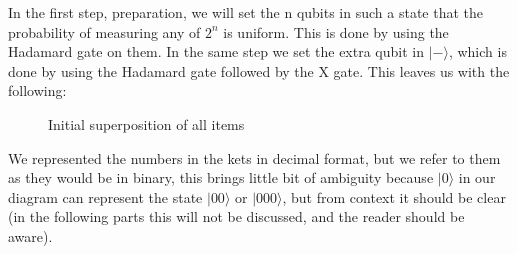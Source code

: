 In the first step, preparation, we will set the n qubits in such a state that the probability of measuring any of $2^n$ is uniform. This is done by using the Hadamard gate on them. In the same step we set the extra qubit in $|-\rangle$, which is done by using the Hadamard gate followed by the X gate. This leaves us with the following:

\begin{center}
\begin{figure}[h]
\caption{Initial superposition of all items} \label{state_pref_graph}
\end{figure}
\end{center}

We represented the numbers in the kets in decimal format, but we refer to them as they would be in binary, this brings little bit of ambiguity because $|0\rangle$ in our diagram can represent the state $|00\rangle$ or $|000\rangle$, but from context it should be clear (in the following parts this will not be discussed, and the reader should be aware). 


